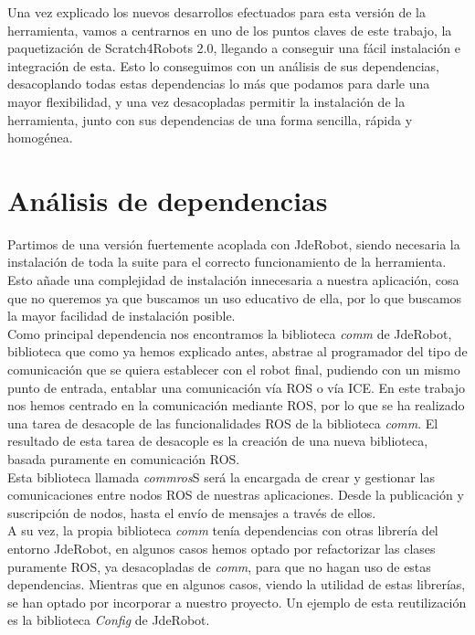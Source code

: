 Una vez explicado los nuevos desarrollos efectuados para esta versión de la herramienta, vamos a centrarnos en uno de los puntos claves de este trabajo, la paquetización de Scratch4Robots 2.0, llegando a conseguir una fácil instalación e integración de esta. Esto lo conseguimos con un análisis de sus dependencias, desacoplando todas estas dependencias lo más que podamos para darle una mayor flexibilidad, y una vez desacopladas permitir la instalación de la herramienta, junto con sus dependencias de una forma sencilla, rápida y homogénea.

\section{Análisis de dependencias}
\label{sec:dependencias}
Partimos de una versión fuertemente acoplada con JdeRobot, siendo necesaria la instalación de toda la suite para el correcto funcionamiento de la herramienta. Esto añade una complejidad de instalación innecesaria a nuestra aplicación, cosa que no queremos ya que buscamos un uso educativo de ella, por lo que buscamos la mayor facilidad de instalación posible.\\

Como principal dependencia nos encontramos la biblioteca \textit{comm} de JdeRobot, biblioteca que como ya hemos explicado antes, abstrae al programador del tipo de comunicación que se quiera establecer con el robot final, pudiendo con un mismo punto de entrada, entablar una comunicación vía ROS o vía ICE. En este trabajo nos hemos centrado en la comunicación mediante ROS, por lo que se ha realizado una tarea de desacople de las funcionalidades ROS de la biblioteca \textit{comm}. El resultado de esta tarea de desacople es la creación de una nueva biblioteca, basada puramente en comunicación ROS.\\

Esta biblioteca llamada \textit{commros}S será la encargada de crear y gestionar las comunicaciones entre nodos ROS de nuestras aplicaciones. Desde la publicación y suscripción de nodos, hasta el envío de mensajes a través de ellos.\\

A su vez, la propia biblioteca \textit{comm} tenía dependencias con otras librería del entorno JdeRobot, en algunos casos hemos optado por refactorizar las clases puramente ROS, ya desacopladas de \textit{comm}, para que no hagan uso de estas dependencias. Mientras que en algunos casos, viendo la utilidad de estas librerías, se han optado por incorporar a nuestro proyecto. Un ejemplo de esta reutilización es la biblioteca \textit{Config} de JdeRobot.\\

